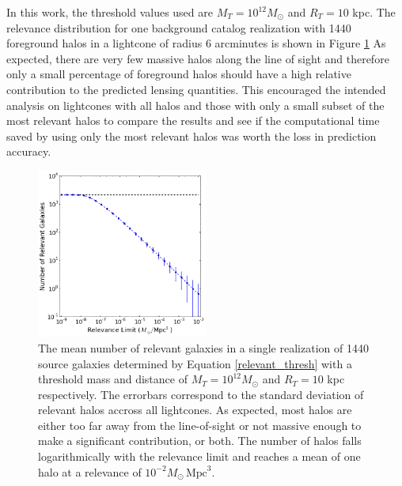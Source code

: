 \documentclass[%
 reprint,
 amsmath,amssymb,
 aps,nofootinbib
]{revtex4-1}
\begin{document}
In this work, the threshold values used are ${M_T=10^{12}M_\odot}$ and ${R_T=10}$ kpc. The relevance distribution for one background catalog realization with 1440 foreground halos in a lightcone of radius 6 arcminutes is shown in Figure \ref{fig:rel_dist} As expected, there are very few massive halos along the line of sight and therefore only a small percentage of foreground halos should have a high relative contribution to the predicted lensing quantities. This encouraged the intended analysis on lightcones with all halos and those with only a small subset of the most relevant halos to compare the results and see if the computational time saved by using only the most relevant halos was worth the loss in prediction accuracy.

\begin{figure}
    \centering
    \includegraphics[width=0.5\textwidth]{figs-swe/thesis/relevance_distribution.png}
    \captionsetup{justification=raggedright,singlelinecheck=false}
    \caption{The mean number of relevant galaxies in a single realization of 1440 source galaxies determined by Equation \eqref{relevant_thresh} with a threshold mass and distance of ${M_T=10^{12}M_\odot}$ and ${R_T=10}$ kpc respectively. The errorbars correspond to the standard deviation of relevant halos accross all lightcones. As expected, most halos are either too far away from the line-of-sight or not massive enough to make a significant contribution, or both. The number of halos falls logarithmically with the relevance limit and reaches a mean of one halo at a relevance of ${10^{-2}M_\odot\,\text{Mpc}^3}$.}
    \label{fig:rel_dist}
\end{figure}
\end{document}
